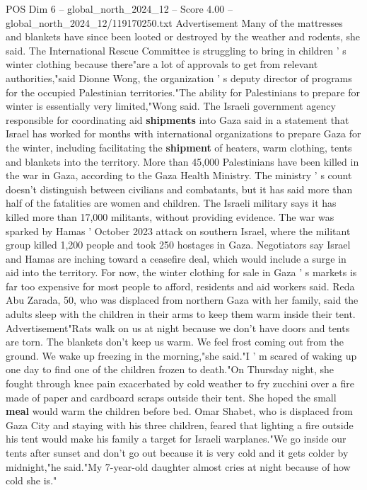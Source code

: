 \begin{textsample}{POS Dim 6 – global\_north\_2024\_12 – Score 4.00 – global\_north\_2024\_12/119170250.txt}
Advertisement Many of the mattresses and blankets have since been looted or destroyed by the weather and rodents, she said.
The International Rescue Committee is struggling to bring in children ' s winter clothing because there"are a lot of approvals to get from relevant authorities,"said Dionne Wong, the organization ' s deputy director of programs for the occupied Palestinian territories."The ability for Palestinians to prepare for winter is essentially very limited,"Wong said.
The Israeli government agency responsible for coordinating aid \textbf{shipments} into Gaza said in a statement that Israel has worked for months with international organizations to prepare Gaza for the winter, including facilitating the \textbf{shipment} of heaters, warm clothing, tents and blankets into the territory.
More than 45,000 Palestinians have been killed in the war in Gaza, according to the Gaza Health Ministry.
The ministry ' s count doesn't distinguish between civilians and combatants, but it has said more than half of the fatalities are women and children.
The Israeli military says it has killed more than 17,000 militants, without providing evidence.
The war was sparked by Hamas ' October 2023 attack on southern Israel, where the militant group killed 1,200 people and took 250 hostages in Gaza.
Negotiators say Israel and Hamas are inching toward a ceasefire deal, which would include a surge in aid into the territory.
For now, the winter clothing for sale in Gaza ' s markets is far too expensive for most people to afford, residents and aid workers said.
Reda Abu Zarada, 50, who was displaced from northern Gaza with her family, said the adults sleep with the children in their arms to keep them warm inside their tent.
Advertisement"Rats walk on us at night because we don't have doors and tents are torn.
The blankets don't keep us warm.
We feel frost coming out from the ground.
We wake up freezing in the morning,"she said."I ' m scared of waking up one day to find one of the children frozen to death."On Thursday night, she fought through knee pain exacerbated by cold weather to fry zucchini over a fire made of paper and cardboard scraps outside their tent.
She hoped the small \textbf{meal} would warm the children before bed.
Omar Shabet, who is displaced from Gaza City and staying with his three children, feared that lighting a fire outside his tent would make his family a target for Israeli warplanes."We go inside our tents after sunset and don't go out because it is very cold and it gets colder by midnight,"he said."My 7-year-old daughter almost cries at night because of how cold she is."

\end{textsample}
